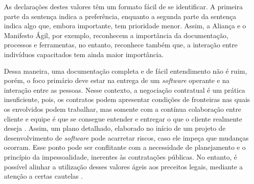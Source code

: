 As declarações destes valores têm um formato fácil de se identificar. A primeira parte da sentença indica a preferência, enquanto a segunda parte da sentença indica algo que, embora importante, tem prioridade menor. Assim, a Aliança e o Manifesto Ágil, por exemplo, reconhecem a importância da documentação, processos e ferramentas, no entanto, reconhece também que, a interação entre indivíduos capacitados tem ainda maior importância.

Dessa maneira, uma documentação completa e de fácil entendimento não é ruim, porém, o foco primário deve estar na entrega de um  \textit{software} operante e na interação entre as pessoas. Nesse contexto, a negociação contratual é um prática insuficiente, pois, os contratos podem apresentar condições de fronteiras nas quais os envolvidos podem trabalhar, mas somente com a contínua colaboração entre cliente e equipe é que se consegue entender e entregar o que o cliente realmente deseja \cite{jim}. Assim, um plano detalhado, elaborado no início de um projeto de desenvolvimento de \textit{software} pode acarretar riscos, caso ele impeça que mudanças ocorram. Esse ponto pode ser conflitante com a necessidade de planejamento e o princípio da impessoalidade, inerentes às contratações públicas. No entanto, é possível alinhar a utilização desses valores ágeis aos preceitos legais, mediante a atenção a certas cautelas \cite{TCU:2013}.

